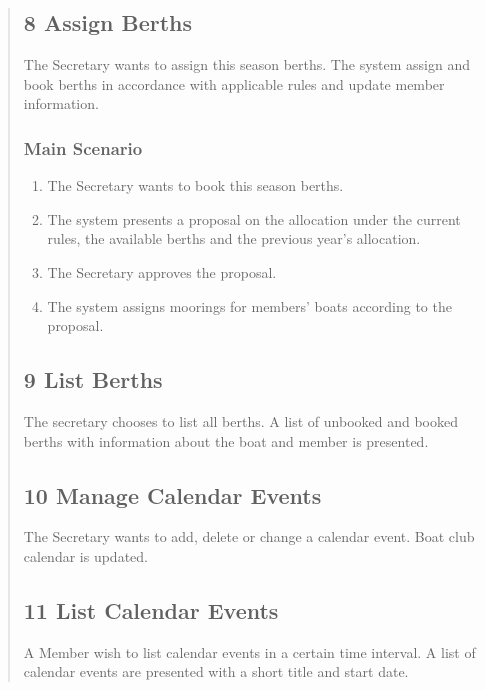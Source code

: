 \begin{quote}
\subsection{8 Assign Berths}\label{assign-berths}

The Secretary wants to assign this season berths. The system assign and
book berths in accordance with applicable rules and update member
information.

\subsubsection{Main Scenario}\label{main-scenario-4}

\begin{enumerate}
\tightlist
\item
  The Secretary wants to book this season berths.
\item
  The system presents a proposal on the allocation under the current
  rules, the available berths and the previous year's allocation.
\item
  The Secretary approves the proposal.
\item
  The system assigns moorings for members' boats according to the
  proposal.
\end{enumerate}

\subsection{9 List Berths}\label{list-berths}

The secretary chooses to list all berths. A list of unbooked and booked
berths with information about the boat and member is presented.

\subsection{10 Manage Calendar Events}\label{manage-calendar-events}

The Secretary wants to add, delete or change a calendar event. Boat club
calendar is updated.

\subsection{11 List Calendar Events}\label{list-calendar-events}

A Member wish to list calendar events in a certain time interval. A list
of calendar events are presented with a short title and start date.


\end{quote}
